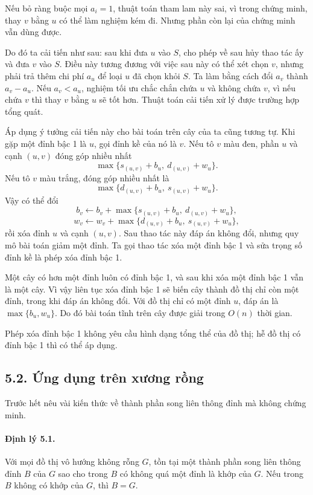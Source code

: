\documentclass[11pt]{article}
\begin{document}
Nếu bỏ ràng buộc mọi \(a_i=1\), thuật toán tham lam này sai, vì trong chứng
minh, thay \(v\) bằng \(u\) có thể làm nghiệm kém đi. Nhưng phần còn lại của
chứng minh vẫn dùng được.

Do đó ta cải tiến như sau: sau khi đưa \(u\) vào \(S\), cho phép về sau hủy
thao tác ấy và đưa \(v\) vào \(S\). Điều này tương đương với việc sau này có
thể xét chọn \(v\), nhưng phải trả thêm chi phí \(a_u\) để loại \(u\) đã chọn
khỏi \(S\). Ta làm bằng cách đổi \(a_v\) thành \(a_v-a_u\). Nếu \(a_v<a_u\),
nghiệm tối ưu chắc chắn chứa \(u\) và không chứa \(v\), vì nếu chứa \(v\) thì
thay \(v\) bằng \(u\) sẽ tốt hơn. Thuật toán cải tiến xử lý được trường hợp
tổng quát.

Áp dụng ý tưởng cải tiến này cho bài toán trên cây của ta cũng tương tự. Khi
gặp một đỉnh bậc 1 là \(u\), gọi đỉnh kề của nó là \(v\). Nếu tô \(v\) màu
đen, phần \(u\) và cạnh \((u,v)\) đóng góp nhiều nhất
\[
  \max\{s_{(u,v)}+b_u,\ d_{(u,v)}+w_u\}.
\]
Nếu tô \(v\) màu trắng, đóng góp nhiều nhất là
\[
  \max\{d_{(u,v)}+b_u,\ s_{(u,v)}+w_u\}.
\]
Vậy có thể đổi
\[
b_v\leftarrow b_v+\max\{s_{(u,v)}+b_u,\ d_{(u,v)}+w_u\},
\]
\[
w_v\leftarrow w_v+\max\{d_{(u,v)}+b_u,\ s_{(u,v)}+w_u\},
\]
rồi xóa đỉnh \(u\) và cạnh \((u,v)\). Sau thao tác này đáp án không đổi,
nhưng quy mô bài toán giảm một đỉnh. Ta gọi thao tác xóa một đỉnh bậc 1 và
sửa trọng số đỉnh kề là phép xóa đỉnh bậc 1.

Một cây có hơn một đỉnh luôn có đỉnh bậc 1, và sau khi xóa một đỉnh bậc 1 vẫn
là một cây. Vì vậy liên tục xóa đỉnh bậc 1 sẽ biến cây thành đồ thị chỉ còn
một đỉnh, trong khi đáp án không đổi. Với đồ thị chỉ có một đỉnh \(u\), đáp án
là \(\max\{b_u,w_u\}\). Do đó bài toán tĩnh trên cây được giải trong \(O(n)\)
thời gian.

Phép xóa đỉnh bậc 1 không yêu cầu hình dạng tổng thể của đồ thị; hễ đồ thị có
đỉnh bậc 1 thì có thể áp dụng.

\subsection*{5.2. Ứng dụng trên xương rồng}

Trước hết nêu vài kiến thức về thành phần song liên thông đỉnh mà không chứng
minh.

\paragraph{Định lý 5.1.}
Với mọi đồ thị vô hướng không rỗng \(G\), tồn tại một thành phần song liên
thông đỉnh \(B\) của \(G\) sao cho trong \(B\) có không quá một đỉnh là khớp
của \(G\). Nếu trong \(B\) không có khớp của \(G\), thì \(B=G\).
\end{document}
